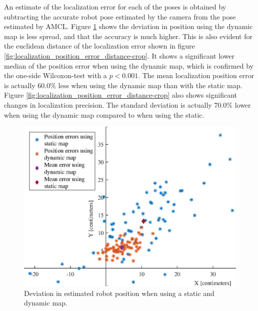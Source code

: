 An estimate of the localization error for each of the poses is obtained by subtracting the accurate robot pose estimated by the camera from the pose estimated by AMCL.
Figure \ref{fig:precision_test_positions} shows the deviation in position using the dynamic map is less spread, and that the accuracy is much higher.
This is also evident for the euclidean distance of the localization error shown in figure \ref{fig:localization_position_error_distance-crop}. 
It shows a significant lower median of the position error when using the dynamic map, which is confirmed by the one-side Wilcoxon-test with a $p<0.001$.
The mean localization position error is actually $60.0\%$ less when using the dynamic map than with the static map.
Figure \ref{fig:localization_position_error_distance-crop} also shows significant changes in localization precision. 
The standard deviation is actually $70.0\%$ lower when using the dynamic map compared to when using the static.

\begin{figure}
    \centering
    \includegraphics[scale=1]{chapters/evaluation/figures/Localization_position_errors}
    \caption{Deviation in estimated robot position when using a static and dynamic map.}
    \label{fig:precision_test_positions}
\end{figure}

